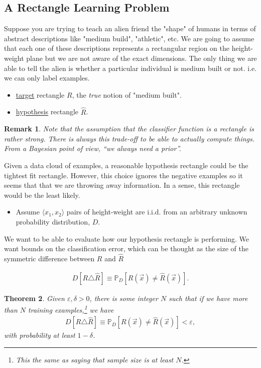 \documentclass[12pt, letterpaper]{article}
\numberwithin{equation}{section} %
\newcommand{\ul}{\underline}
\newcommand{\mb}{\mathbb}
\newcommand{\ve}{\varepsilon}
\newtheorem{theorem}{Theorem}[section]
\newtheorem{remark}[theorem]{Remark}
\theoremstyle{definition}
\theoremstyle{remark}
\begin{document}
\subsection{A Rectangle Learning Problem}

Suppose you are trying to teach an alien friend the "shape" of humans in terms of abstract descriptions like "medium build", "athletic", etc. We are going to assume that each one of these descriptions represents a rectangular region on the height-weight plane but we are not aware of the exact dimensions. The only thing we are able to tell the alien is whether a particular individual is medium built or not. i.e. we can only label examples.

\begin{itemize}
	\item \ul{target} rectangle $R$, the \emph{true} notion of "medium built".
	\item \ul{hypothesis} rectangle $\hat R$. 
\end{itemize}

\begin{remark}
	Note that the assumption that the classifier function is a rectangle is rather strong. There is always this trade-off to be able to actually compute things. From a Bayesian point of view, ``we always need a prior''.
\end{remark}

Given a data cloud of examples, a reasonable hypothesis rectangle could be the tightest fit rectangle. However, this choice ignores the negative examples so it seems that that we are throwing away information. In a sense, this rectangle would be the least likely.

\begin{itemize}
	\item Assume $\langle x_1,x_2 \rangle$ pairs of height-weight are i.i.d. from an arbitrary unknown probability distribution, $D$.
\end{itemize}

We want to be able to evaluate how our hypothesis rectangle is performing. We want bounds on the classification error, which can be thought as the size of the symmetric difference between $R$ and $\hat R$

\begin{align*}
	D[R\triangle \hat R] \equiv \mb P_D[R(\vec x) \ne \hat R(\vec x)].
\end{align*}

\begin{theorem}
	Given $\ve,\delta >0$, there is some integer $N$ such that if we have more than $N$ training examples,\footnote{This the same as saying that sample size is at least $N$.} we have
	\begin{align*}
		D[R\triangle \hat R] \equiv \mb P_D[R(\vec x) \ne \hat R(\vec x)] < \ve,
	\end{align*}
	with probability at least $1-\delta$.
\end{theorem}
\end{document}
